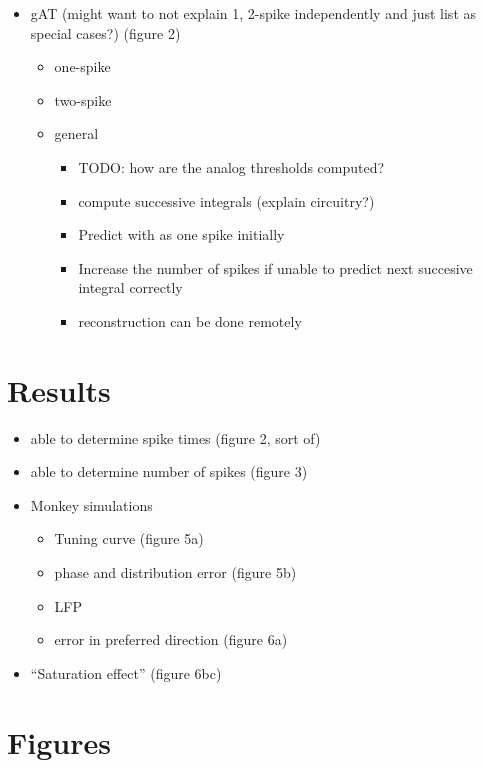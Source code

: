 \documentclass[]{article}
\begin{document}
\begin{itemize}
\item gAT (might want to not explain 1, 2-spike independently and just list as special cases?) (figure 2)
\begin{itemize}
\item one-spike
\item two-spike
\item general
\begin{itemize}
\item TODO: how are the analog thresholds computed?
\item compute successive integrals (explain circuitry?)
\item Predict with as one spike initially
\item Increase the number of spikes if unable to predict next succesive integral correctly
\item reconstruction can be done remotely
\end{itemize}
\end{itemize}
\end{itemize}

\section{Results}

\begin{itemize}
\item able to determine spike times (figure 2, sort of)
\item able to determine number of spikes (figure 3)
\item Monkey simulations
\begin{itemize}
\item Tuning curve (figure 5a)
\item phase and distribution error (figure 5b)
\item LFP
\item error in preferred direction (figure 6a)
\end{itemize}
\item ``Saturation effect'' (figure 6bc)
\end{itemize}

\section*{Figures}
\end{document}
